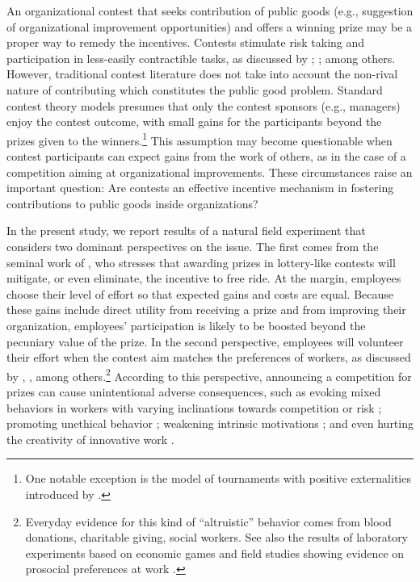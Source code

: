 \documentclass[12pt, titlepage]{article}
\begin{document}
An organizational contest that seeks contribution of public goods (e.g.,
suggestion of organizational improvement opportunities) and offers a
winning prize may be a proper way to remedy the incentives. Contests
stimulate risk taking and participation in less-easily contractible
tasks, as discussed by \citet{lazear1981rank};
\citet{green1983comparison}; \citet{mary1984economic} among others.
However, traditional contest literature does not take into account the
non-rival nature of contributing which constitutes the public good
problem. Standard contest theory models presumes that only the contest
sponsors (e.g., managers) enjoy the contest outcome, with small gains
for the participants beyond the prizes given to the winners.\footnote{One
  notable exception is the model of tournaments with positive
  externalities introduced by \citet{drago1988incentive}.} This
assumption may become questionable when contest participants can expect
gains from the work of others, as in the case of a competition aiming at
organizational improvements. These circumstances raise an important
question: Are contests an effective incentive mechanism in fostering
contributions to public goods inside organizations?

In the present study, we report results of a natural field experiment
that considers two dominant perspectives on the issue. The first comes
from the seminal work of \citet{morgan2000financing}, who stresses that
awarding prizes in lottery-like contests will mitigate, or even
eliminate, the incentive to free ride. At the margin, employees choose
their level of effort so that expected gains and costs are equal.
Because these gains include direct utility from receiving a prize and
from improving their organization, employees' participation is likely to
be boosted beyond the pecuniary value of the prize. In the second
perspective, employees will volunteer their effort when the contest aim
matches the preferences of workers, as discussed by
\citet{besley2005competition}, \citet{prendergast2007motivation},
\citet{delfgaauw2008incentives} among others.\footnote{Everyday evidence
  for this kind of ``altruistic'' behavior comes from blood donations,
  charitable giving, social workers. See also the results of laboratory
  experiments based on economic games
  \citep[see][]{levitt2007laboratory} and field studies showing evidence
  on prosocial preferences at work
  \citep{bandiera2005social, dellavigna2016estimating}.} According to
this perspective, announcing a competition for prizes can cause
unintentional adverse consequences, such as evoking mixed behaviors in
workers with varying inclinations towards competition or risk
\citep[e.g., men and women][]{niederle2007women, croson2009gender};
promoting unethical behavior \citep{lazear1989pay, charness2013dark};
weakening intrinsic motivations \citep{reeve1996elements, frey1997not};
and even hurting the creativity of innovative work
\citep{erat2015incentives}.
\end{document}
